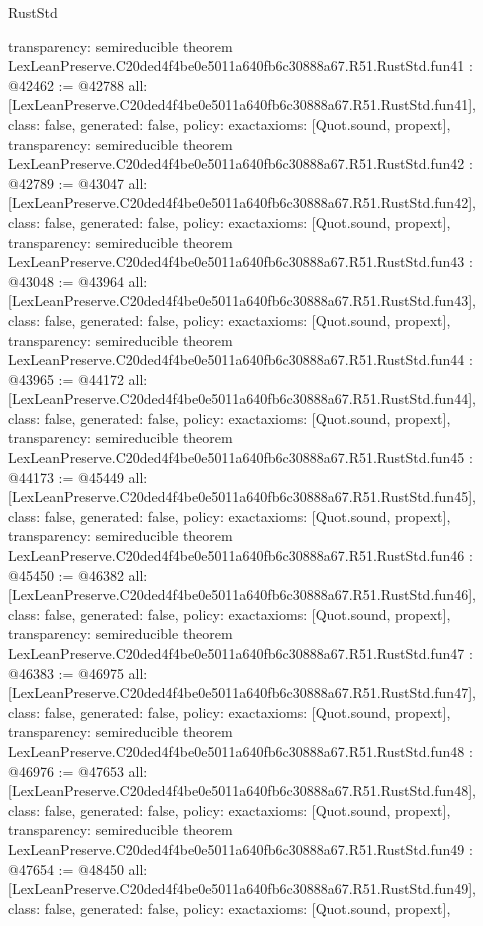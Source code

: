 \begin{lexlean}{RustStd}
\begin{coremodule}
{  transparency: semireducible
}
theorem LexLeanPreserve.C20ded4f4be0e5011a640fb6c30888a67.R51.RustStd.fun41 : @42462 := @42788 {
  all: [LexLeanPreserve.C20ded4f4be0e5011a640fb6c30888a67.R51.RustStd.fun41],
  class: false,
  generated: false,
  policy: exact{axioms: [Quot.sound, propext]},
  transparency: semireducible
}
theorem LexLeanPreserve.C20ded4f4be0e5011a640fb6c30888a67.R51.RustStd.fun42 : @42789 := @43047 {
  all: [LexLeanPreserve.C20ded4f4be0e5011a640fb6c30888a67.R51.RustStd.fun42],
  class: false,
  generated: false,
  policy: exact{axioms: [Quot.sound, propext]},
  transparency: semireducible
}
theorem LexLeanPreserve.C20ded4f4be0e5011a640fb6c30888a67.R51.RustStd.fun43 : @43048 := @43964 {
  all: [LexLeanPreserve.C20ded4f4be0e5011a640fb6c30888a67.R51.RustStd.fun43],
  class: false,
  generated: false,
  policy: exact{axioms: [Quot.sound, propext]},
  transparency: semireducible
}
theorem LexLeanPreserve.C20ded4f4be0e5011a640fb6c30888a67.R51.RustStd.fun44 : @43965 := @44172 {
  all: [LexLeanPreserve.C20ded4f4be0e5011a640fb6c30888a67.R51.RustStd.fun44],
  class: false,
  generated: false,
  policy: exact{axioms: [Quot.sound, propext]},
  transparency: semireducible
}
theorem LexLeanPreserve.C20ded4f4be0e5011a640fb6c30888a67.R51.RustStd.fun45 : @44173 := @45449 {
  all: [LexLeanPreserve.C20ded4f4be0e5011a640fb6c30888a67.R51.RustStd.fun45],
  class: false,
  generated: false,
  policy: exact{axioms: [Quot.sound, propext]},
  transparency: semireducible
}
theorem LexLeanPreserve.C20ded4f4be0e5011a640fb6c30888a67.R51.RustStd.fun46 : @45450 := @46382 {
  all: [LexLeanPreserve.C20ded4f4be0e5011a640fb6c30888a67.R51.RustStd.fun46],
  class: false,
  generated: false,
  policy: exact{axioms: [Quot.sound, propext]},
  transparency: semireducible
}
theorem LexLeanPreserve.C20ded4f4be0e5011a640fb6c30888a67.R51.RustStd.fun47 : @46383 := @46975 {
  all: [LexLeanPreserve.C20ded4f4be0e5011a640fb6c30888a67.R51.RustStd.fun47],
  class: false,
  generated: false,
  policy: exact{axioms: [Quot.sound, propext]},
  transparency: semireducible
}
theorem LexLeanPreserve.C20ded4f4be0e5011a640fb6c30888a67.R51.RustStd.fun48 : @46976 := @47653 {
  all: [LexLeanPreserve.C20ded4f4be0e5011a640fb6c30888a67.R51.RustStd.fun48],
  class: false,
  generated: false,
  policy: exact{axioms: [Quot.sound, propext]},
  transparency: semireducible
}
theorem LexLeanPreserve.C20ded4f4be0e5011a640fb6c30888a67.R51.RustStd.fun49 : @47654 := @48450 {
  all: [LexLeanPreserve.C20ded4f4be0e5011a640fb6c30888a67.R51.RustStd.fun49],
  class: false,
  generated: false,
  policy: exact{axioms: [Quot.sound, propext]},
}
\end{coremodule}
\end{lexlean}
